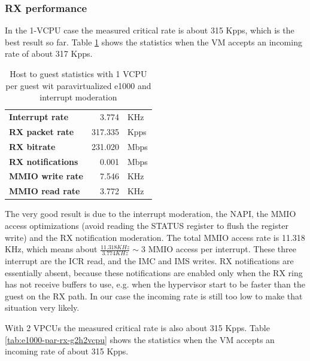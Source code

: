 \subsubsection{RX performance}
In the 1-VCPU case the measured critical rate is about 315 Kpps, which is the best result so far. Table \ref{tab:e1000-par-rx-g2h1vcpu}
shows the statistics when the VM accepts an incoming rate of about 317 Kpps.

\begin{table}
\begin{center}
\begin{tabular}{lrl}
\toprule
\textbf{Interrupt rate} & 3.774 & KHz\\
\textbf{RX packet rate} & 317.335 & Kpps\\
\textbf{RX bitrate} & 231.020 & Mbps\\
\textbf{RX notifications} & 0.001 & Mbps\\
\textbf{MMIO write rate} & 7.546 & KHz\\
\textbf{MMIO read rate} & 3.772 & KHz\\
\bottomrule
\end{tabular}
\end{center}
\caption{Host to guest statistics with 1 VCPU per guest wit paravirtualized e1000 and interrupt moderation}
\label{tab:e1000-par-rx-g2h1vcpu}
\end{table}

The very good result is due to the interrupt moderation, the NAPI, the MMIO access optimizations (avoid reading the STATUS register to
flush the register write) and the RX notification moderation.
The total MMIO access rate is 11.318 KHz, which means about $\frac{11.318 KHz}{3.774 KHz} \sim 3$ MMIO access per interrupt. These three
interrupt are the ICR read, and the IMC and IMS writes. RX notifications are essentially absent, because these notifications are enabled
only when the RX ring has not receive buffers to use, e.g. when the hypervisor start to be faster than the guest on the RX path.
In our case the incoming rate is still too low to make that situation very likely.

\vspace{0.5cm}

With 2 VPCUs the measured critical rate is also about 315 Kpps. Table \ref{tab:e1000-par-rx-g2h2vcpu}
shows the statistics when the VM accepts an incoming rate of about 315 Kpps.

